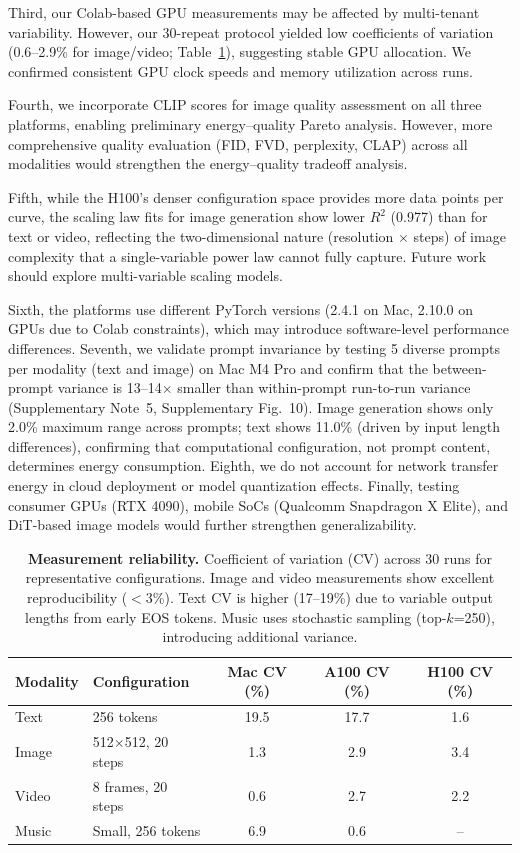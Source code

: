 \documentclass[11pt]{article}
\begin{document}
Third, our Colab-based GPU measurements may be affected by multi-tenant variability. However, our 30-repeat protocol yielded low coefficients of variation (0.6--2.9\% for image/video; Table~\ref{tab:reliability}), suggesting stable GPU allocation. We confirmed consistent GPU clock speeds and memory utilization across runs.

Fourth, we incorporate CLIP scores for image quality assessment on all three platforms, enabling preliminary energy--quality Pareto analysis. However, more comprehensive quality evaluation (FID, FVD, perplexity, CLAP) across all modalities would strengthen the energy--quality tradeoff analysis.

Fifth, while the H100's denser configuration space provides more data points per curve, the scaling law fits for image generation show lower $R^2$ (0.977) than for text or video, reflecting the two-dimensional nature (resolution $\times$ steps) of image complexity that a single-variable power law cannot fully capture. Future work should explore multi-variable scaling models.

Sixth, the platforms use different PyTorch versions (2.4.1 on Mac, 2.10.0 on GPUs due to Colab constraints), which may introduce software-level performance differences. Seventh, we validate prompt invariance by testing 5 diverse prompts per modality (text and image) on Mac M4 Pro and confirm that the between-prompt variance is 13--14$\times$ smaller than within-prompt run-to-run variance (Supplementary Note~5, Supplementary Fig.~10). Image generation shows only 2.0\% maximum range across prompts; text shows 11.0\% (driven by input length differences), confirming that computational configuration, not prompt content, determines energy consumption. Eighth, we do not account for network transfer energy in cloud deployment or model quantization effects. Finally, testing consumer GPUs (RTX 4090), mobile SoCs (Qualcomm Snapdragon X Elite), and DiT-based image models would further strengthen generalizability.

\begin{table}[t]
\centering
\caption{\textbf{Measurement reliability.} Coefficient of variation (CV) across 30 runs for representative configurations. Image and video measurements show excellent reproducibility ($<$3\%). Text CV is higher (17--19\%) due to variable output lengths from early EOS tokens. Music uses stochastic sampling (top-$k$=250), introducing additional variance.}
\label{tab:reliability}
\small
\begin{tabular}{@{}llccc@{}}
\toprule
\textbf{Modality} & \textbf{Configuration} & \textbf{Mac CV (\%)} & \textbf{A100 CV (\%)} & \textbf{H100 CV (\%)} \\
\midrule
Text & 256 tokens & 19.5 & 17.7 & 1.6 \\
Image & 512$\times$512, 20 steps & 1.3 & 2.9 & 3.4 \\
Video & 8 frames, 20 steps & 0.6 & 2.7 & 2.2 \\
Music & Small, 256 tokens & 6.9 & 0.6 & -- \\
\bottomrule
\end{tabular}
\end{table}
\end{document}
